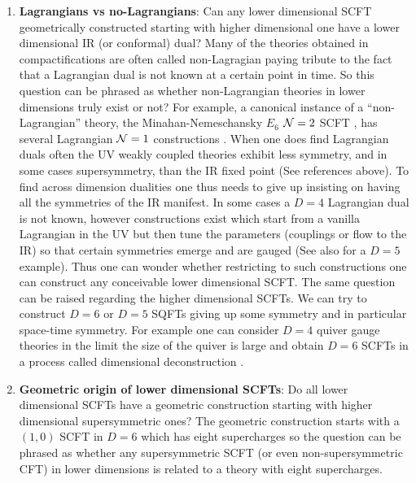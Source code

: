 \documentclass[12pt]{article}
\begin{document}
\begin{enumerate}
   


 \item  {\bf Lagrangians vs no-Lagrangians}: Can any lower dimensional SCFT geometrically constructed starting with higher dimensional one have a lower dimensional IR (or conformal) dual? Many of the theories obtained in compactifications are often called non-Lagragian paying tribute to the fact that a Lagrangian dual is not known at a certain point in time. So this question can be phrased as whether non-Lagrangian theories in lower dimensions truly exist or not? For  example, a canonical instance of a ``non-Lagrangian'' theory, the Minahan-Nemeschansky $E_6$  ${\cal N}=2$ SCFT \cite{Minahan:1996fg},  has several Lagrangian ${\cal N}=1$ constructions \cite{Zafrir:2019hps,Etxebarria:2021lmq,Gadde:2015xta}. When one does find Lagrangian duals often the UV weakly coupled theories exhibit less symmetry, and in some cases supersymmetry, than the IR fixed point (See references above). To find across dimension dualities one thus needs to give up insisting on having all the symmetries of the IR manifest. In some cases a $D=4$ Lagrangian dual is not known, however constructions exist which start from a vanilla Lagrangian in the UV but then tune the parameters (couplings or flow to the IR) so that certain symmetries emerge and are gauged \cite{Gadde:2015xta,Razamat:2019ukg,Razamat:2020bix,Gaiotto:2015usa,Kim:2017toz,Razamat:2016dpl,Agarwal:2018ejn} (See also \cite{Ohmori:2015pia} for a $D=5$ example). Thus one can wonder whether restricting to such constructions one can construct any conceivable lower dimensional SCFT. 
 The same question can be raised regarding the higher dimensional SCFTs. We can try to construct $D=6$ or $D=5$ SQFTs giving up some symmetry and in particular space-time symmetry. For example one can consider $D=4$ quiver gauge theories in the limit the size of the quiver is large and obtain $D=6$ SCFTs in a process called dimensional deconstruction \cite{Arkani-Hamed:2001wsh,Hayling:2018fmv,Hayling:2017cva}.


 \item  {\bf Geometric origin of lower dimensional SCFTs}: Do all lower dimensional SCFTs have a geometric construction starting with higher dimensional supersymmetric ones? The geometric construction starts with a $(1,0)$ SCFT in $D=6$ which has eight supercharges so the question can be phrased as whether any supersymmetric  SCFT (or even non-supersymmetric CFT) in lower dimensions is related to a theory with eight supercharges.


\end{enumerate}
\end{document}
